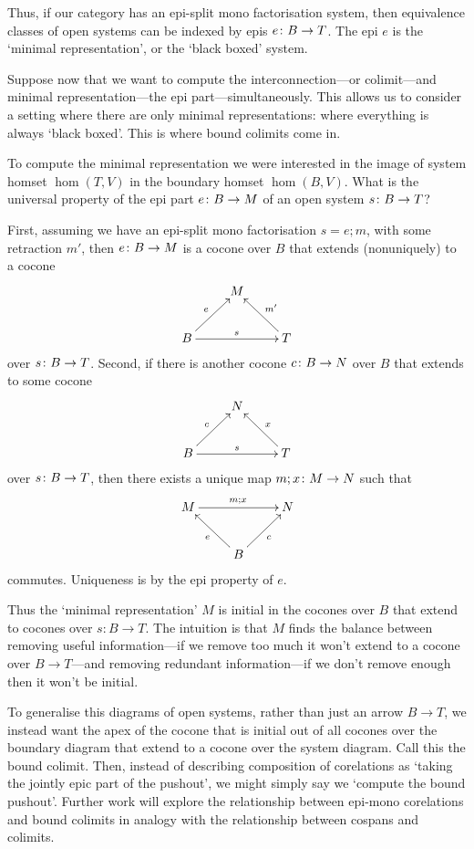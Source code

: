 Thus, if our category has an epi-split mono factorisation system, then
equivalence classes of open systems can be indexed by epis $e{\colon} B \to T$. The
epi $e$ is the `minimal representation', or the `black boxed' system.

Suppose now that we want to compute the interconnection---or colimit---and minimal
representation---the epi part---simultaneously. This allows us to consider a
setting where there are only minimal representations: where everything is always
`black boxed'. This is where bound colimits come in.

To compute the minimal representation we were interested in the image of system
homset $\hom(T,V)$ in the boundary homset $\hom(B,V)$. What is the universal
property of the epi part $e{\colon} B \to M$ of an open system $s{\colon} B \to T$?

First, assuming we have an epi-split mono factorisation $s = e;m$, with some
retraction $m'$, then $e{\colon} B \to M$ is a cocone over $B$ that extends
(nonuniquely) to a cocone
\[
  \xymatrix{
    & M \\
    B \ar[ur]^e \ar[rr]^s &&  T \ar[ul]_{m'}
  }
\]
over $s{\colon} B \to T$. Second, if there is another cocone $c{\colon} B \to N$ over $B$ that extends to
some cocone
\[
  \xymatrix{
    & N \\
    B \ar[ur]^c \ar[rr]^s &&  T \ar[ul]_{x}
  }
\]
over $s{\colon} B \to T$, then there exists a unique map $m;x{\colon} M \to N$ such that
\[
  \xymatrix{
    M \ar[rr]^{m;x} && N\\
    & B \ar[ul]^e \ar[ur]_c
  }
\]
commutes. Uniqueness is by the epi property of $e$.

Thus the `minimal representation' $M$ is initial in the cocones over $B$ that
extend to cocones over $s: B \to T$.  The intuition is that $M$ finds the
balance between removing useful information---if we remove too much it won't
extend to a cocone over $B \to T$---and removing redundant information---if we
don't remove enough then it won't be initial.

To generalise this diagrams of open systems, rather than just an arrow $B \to
T$, we instead want the apex of the cocone that is initial out of all cocones
over the boundary diagram that extend to a cocone over the system diagram. Call
this the bound colimit. Then, instead of describing composition of corelations
as `taking the jointly epic part of the pushout', we might simply say we
`compute the bound pushout'. Further work will explore the relationship between
epi-mono corelations and bound colimits in analogy with the relationship between
cospans and colimits.


